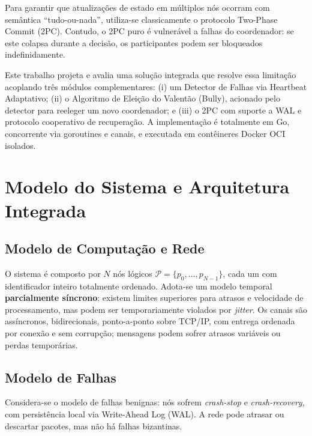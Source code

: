 \documentclass[conference]{IEEEtran}
\begin{document}
Para garantir que atualizações de estado em múltiplos nós ocorram com semântica ``tudo-ou-nada'', utiliza-se classicamente o protocolo Two-Phase Commit (2PC). Contudo, o 2PC puro é vulnerável a falhas do coordenador: se este colapsa durante a decisão, os participantes podem ser bloqueados indefinidamente.

Este trabalho projeta e avalia uma solução integrada que resolve essa limitação acoplando três módulos complementares: (i) um Detector de Falhas via Heartbeat Adaptativo; (ii) o Algoritmo de Eleição do Valentão (Bully), acionado pelo detector para reeleger um novo coordenador; e (iii) o 2PC com suporte a WAL e protocolo cooperativo de recuperação. A implementação é totalmente em Go, concorrente via goroutines e canais, e executada em contêineres Docker OCI isolados.

\section{Modelo do Sistema e Arquitetura Integrada}

\subsection{Modelo de Computação e Rede}
O sistema é composto por $N$ nós lógicos $\mathcal{P}=\{p_0,\dots,p_{N-1}\}$, cada um com identificador inteiro totalmente ordenado. Adota-se um modelo temporal \textbf{parcialmente síncrono}: existem limites superiores para atrasos e velocidade de processamento, mas podem ser temporariamente violados por \textit{jitter}. Os canais são assíncronos, bidirecionais, ponto-a-ponto sobre TCP/IP, com entrega ordenada por conexão e sem corrupção; mensagens podem sofrer atrasos variáveis ou perdas temporárias.

\subsection{Modelo de Falhas}
Considera-se o modelo de falhas benignas: nós sofrem \textit{crash-stop} e \textit{crash-recovery}, com persistência local via Write-Ahead Log (WAL). A rede pode atrasar ou descartar pacotes, mas não há falhas bizantinas.
\end{document}
